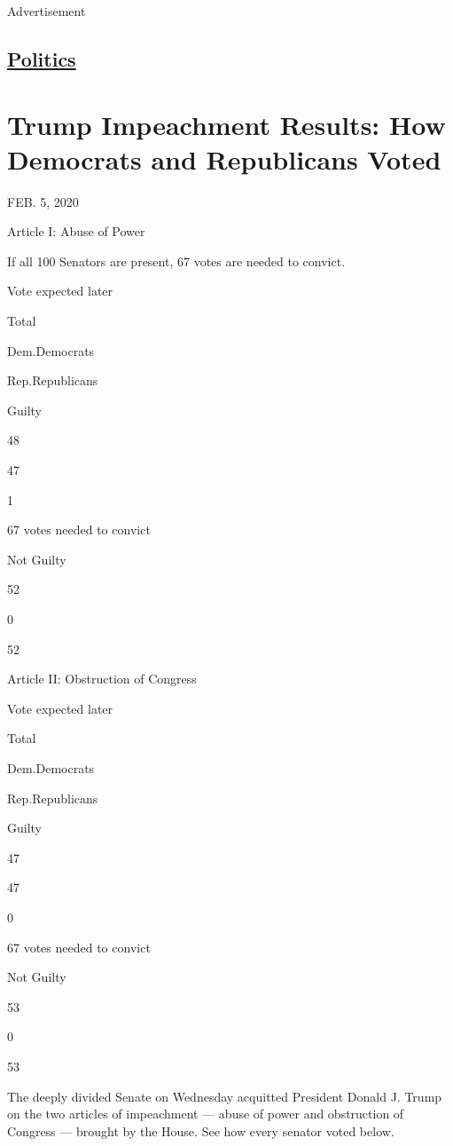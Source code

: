 Advertisement

\hypertarget{-politics-}{%
\subsection{\texorpdfstring{ \href{/section/politics}{Politics}
}{ Politics }}\label{-politics-}}

\hypertarget{trump-impeachment-results-how-democrats-and-republicans-voted}{%
\section{Trump Impeachment Results: How Democrats and Republicans
Voted}\label{trump-impeachment-results-how-democrats-and-republicans-voted}}

FEB. 5, 2020

Article I: Abuse of Power

If all 100 Senators are present, 67 votes are needed to convict.

Vote expected later

Total

Dem.Democrats

Rep.Republicans

Guilty

48

47

1

67 votes needed to convict

Not Guilty

52

0

52

Article II: Obstruction of Congress

Vote expected later

Total

Dem.Democrats

Rep.Republicans

Guilty

47

47

0

67 votes needed to convict

Not Guilty

53

0

53

The deeply divided Senate on Wednesday acquitted President Donald J.
Trump on the two articles of impeachment --- abuse of power and
obstruction of Congress --- brought by the House. See how every senator
voted below.

